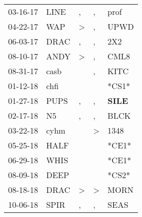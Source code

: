 \begin{supertabular}{p{0.07\textwidth}p{0.06\textwidth}p{0.02\textwidth}p{0.02\textwidth}p{0.06\textwidth}}
          03-16-17\textsuperscript{} &           LINE\textsuperscript{} &                , &                , &           prof\textsuperscript{} \\
          04-22-17\textsuperscript{} &            WAP\textsuperscript{} &     \textgreater &                , &           UPWD\textsuperscript{} \\
          06-03-17\textsuperscript{} &           DRAC\textsuperscript{} &                , &                , &            2X2\textsuperscript{} \\
          08-10-17\textsuperscript{} &           ANDY\textsuperscript{} &     \textgreater &                , &           CML8\textsuperscript{} \\
          08-31-17\textsuperscript{} &           casb\textsuperscript{} &                  &                , &           KITC\textsuperscript{} \\
          01-12-18\textsuperscript{} &           chfi\textsuperscript{} &                  &                  &                            *CS1* \\
          01-27-18\textsuperscript{} &           PUPS\textsuperscript{} &                , &                , &  \textbf{SILE\textsuperscript{}} \\
          02-17-18\textsuperscript{} &             N5\textsuperscript{} &                , &                , &           BLCK\textsuperscript{} \\
          03-22-18\textsuperscript{} &           cyhm\textsuperscript{} &                  &     \textgreater &           1348\textsuperscript{} \\
          05-25-18\textsuperscript{} &           HALF\textsuperscript{} &                  &                  &                            *CE1* \\
          06-29-18\textsuperscript{} &           WHIS\textsuperscript{} &                  &                  &                            *CE1* \\
          08-09-18\textsuperscript{} &           DEEP\textsuperscript{} &                  &                  &                            *CS2* \\
          08-18-18\textsuperscript{} &           DRAC\textsuperscript{} &     \textgreater &     \textgreater &           MORN\textsuperscript{} \\
          10-06-18\textsuperscript{} &           SPIR\textsuperscript{} &                , &                , &           SEAS\textsuperscript{} \\

\end{supertabular}
